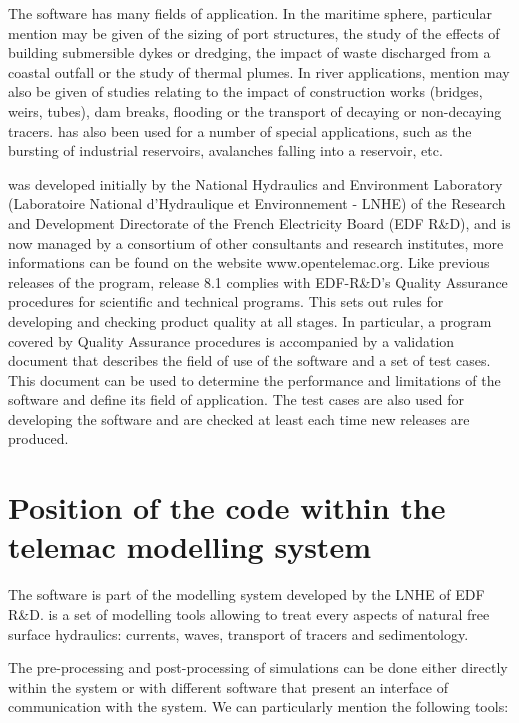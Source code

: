 The software has many fields of application.
In the maritime sphere, particular mention may be given of the sizing of port
structures, the study of the effects of building submersible dykes or dredging,
the impact of waste discharged from a coastal outfall or the study of thermal
plumes.
In river applications, mention may also be given of studies relating to the impact
of construction works (bridges, weirs, tubes), dam breaks,
flooding or the transport of decaying or non-decaying tracers.
 has also been used for a number of special applications,
such as the bursting of industrial reservoirs, avalanches falling
into a reservoir, etc.

 was developed initially by the National Hydraulics and Environment
Laboratory (Laboratoire National d'Hydraulique et Environnement - LNHE)
of the Research and Development Directorate of the French Electricity Board
(EDF R\&D), and is now managed by a consortium
of other consultants and research institutes, more informations can be found
on the website www.opentelemac.org.
Like previous releases of the program, release 8.1 complies with EDF-R\&D's
Quality Assurance procedures for scientific and technical programs.
This sets out rules for developing and checking product quality at all stages.
In particular, a program covered by Quality Assurance procedures is accompanied
by a validation document that describes the field of use of the software
and a set of test cases.
This document can be used to determine the performance and limitations of the
software and define its field of application.
The test cases are also used for developing the software
and are checked at least each time new releases are produced.


\section{Position of the  code within the telemac modelling system}

The  software is part of the \tel modelling system developed by
the LNHE of EDF R\&D. \tel is a set of modelling tools allowing to treat
every aspects of natural free surface hydraulics: currents, waves, transport of
tracers and sedimentology.

The pre-processing and post-processing of simulations can be done either
directly within the \tel system or with different software that present an
interface of communication with the system. We can particularly mention the
following tools:

